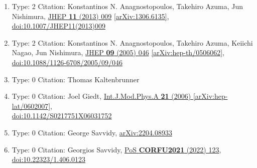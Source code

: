 \documentclass[a4paper,10pt]{article}
\begin{document}
\begin{enumerate}
\begin{enumerate}
  \item Type: 2 Citation: Konstantinos N. Anagnostopoulos, Takehiro Azuma, Jun Nishimura, \href{https://www.doi.org/10.1007/JHEP11(2013)009}{JHEP {\bf 11} (2013) 009}  \href{https://arxiv.org/abs/1306.6135}{[arXiv:1306.6135]},\\\href{https://www.doi.org/10.1007/JHEP11(2013)009}{doi:10.1007/JHEP11(2013)009}
  \item Type: 2 Citation: Konstantinos N. Anagnostopoulos, Takehiro Azuma, Keiichi Nagao, Jun Nishimura, \href{https://www.doi.org/10.1088/1126-6708/2005/09/046}{JHEP {\bf 09} (2005) 046}  \href{https://arxiv.org/abs/hep-th/0506062}{[arXiv:hep-th/0506062]},\\\href{https://www.doi.org/10.1088/1126-6708/2005/09/046}{doi:10.1088/1126-6708/2005/09/046}
  \item Type: 0 Citation: Thomas Kaltenbrunner
  \item Type: 0 Citation: Joel Giedt, \href{https://www.doi.org/10.1142/S0217751X06031752}{Int.J.Mod.Phys.A {\bf 21} (2006) }  \href{https://arxiv.org/abs/hep-lat/0602007}{[arXiv:hep-lat/0602007]},\\\href{https://www.doi.org/10.1142/S0217751X06031752}{doi:10.1142/S0217751X06031752}
  \item Type: 0 Citation: George Savvidy, \href{https://arxiv.org/abs/2204.08933}{arXiv:2204.08933}
  \item Type: 0 Citation: Georgios Savvidy, \href{https://www.doi.org/10.22323/1.406.0123}{PoS {\bf CORFU2021} (2022) 123},\\\href{https://www.doi.org/10.22323/1.406.0123}{doi:10.22323/1.406.0123}

\end{enumerate}
\end{enumerate}
\end{document}
